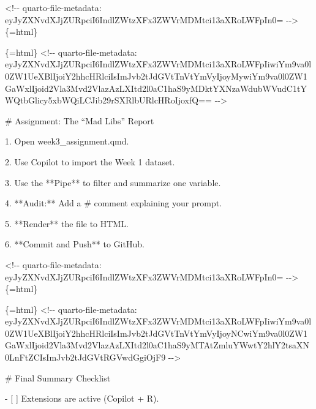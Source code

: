 \documentclass[
  letterpaper,
  DIV=11,
  numbers=noendperiod,
  oneside]{scrreprt}
\newenvironment{Shaded}{\begin{snugshade}}{\end{snugshade}}
\newcommand{\FunctionTok}[1]{\textcolor[rgb]{0.28,0.35,0.67}{#1}}
\newcommand{\InformationTok}[1]{\textcolor[rgb]{0.37,0.37,0.37}{#1}}
\newcommand{\NormalTok}[1]{\textcolor[rgb]{0.00,0.23,0.31}{#1}}
\newcommand{\SpecialStringTok}[1]{\textcolor[rgb]{0.13,0.47,0.30}{#1}}
\newcommand{\VariableTok}[1]{\textcolor[rgb]{0.07,0.07,0.07}{#1}}
\begin{document}
\begin{Shaded}
\begin{Highlighting}[numbers=left,,]
\InformationTok{\textasciigrave{}\textless{}!{-}{-} quarto{-}file{-}metadata: eyJyZXNvdXJjZURpciI6IndlZWtzXFx3ZWVrMDMtci13aXRoLWFpIn0= {-}{-}\textgreater{}\textasciigrave{}}\NormalTok{\{=html\}}

\InformationTok{\textasciigrave{}\textasciigrave{}\textasciigrave{}\{=html\}}
\InformationTok{\textless{}!{-}{-} quarto{-}file{-}metadata: eyJyZXNvdXJjZURpciI6IndlZWtzXFx3ZWVrMDMtci13aXRoLWFpIiwiYm9va0l0ZW1UeXBlIjoiY2hhcHRlciIsImJvb2tJdGVtTnVtYmVyIjoyMywiYm9va0l0ZW1GaWxlIjoid2Vla3Mvd2VlazAzLXItd2l0aC1haS9yMDktYXNzaWdubWVudC1tYWQtbGlicy5xbWQiLCJib29rSXRlbURlcHRoIjoxfQ== {-}{-}\textgreater{}}
\InformationTok{\textasciigrave{}\textasciigrave{}\textasciigrave{}}

\FunctionTok{\# Assignment: The “Mad Libs” Report }


\SpecialStringTok{1.  }\NormalTok{Open }\InformationTok{\textasciigrave{}week3\_assignment.qmd\textasciigrave{}}\NormalTok{.}

\SpecialStringTok{2.  }\NormalTok{Use Copilot to import the Week 1 dataset.}

\SpecialStringTok{3.  }\NormalTok{Use the **Pipe** to filter and summarize one variable.}

\SpecialStringTok{4.  }\NormalTok{**Audit:** Add a }\InformationTok{\textasciigrave{}\#\textasciigrave{}}\NormalTok{ comment explaining your prompt.}

\SpecialStringTok{5.  }\NormalTok{**Render** the file to HTML.}

\SpecialStringTok{6.  }\NormalTok{**Commit and Push** to GitHub.}


\InformationTok{\textasciigrave{}\textless{}!{-}{-} quarto{-}file{-}metadata: eyJyZXNvdXJjZURpciI6IndlZWtzXFx3ZWVrMDMtci13aXRoLWFpIn0= {-}{-}\textgreater{}\textasciigrave{}}\NormalTok{\{=html\}}

\InformationTok{\textasciigrave{}\textasciigrave{}\textasciigrave{}\{=html\}}
\InformationTok{\textless{}!{-}{-} quarto{-}file{-}metadata: eyJyZXNvdXJjZURpciI6IndlZWtzXFx3ZWVrMDMtci13aXRoLWFpIiwiYm9va0l0ZW1UeXBlIjoiY2hhcHRlciIsImJvb2tJdGVtTnVtYmVyIjoyNCwiYm9va0l0ZW1GaWxlIjoid2Vla3Mvd2VlazAzLXItd2l0aC1haS9yMTAtZmluYWwtY2hlY2tsaXN0LnFtZCIsImJvb2tJdGVtRGVwdGgiOjF9 {-}{-}\textgreater{}}
\InformationTok{\textasciigrave{}\textasciigrave{}\textasciigrave{}}

\FunctionTok{\# Final Summary Checklist }


\SpecialStringTok{{-}   }\VariableTok{[ ]}\NormalTok{ Extensions are active (Copilot + R).}


\end{Highlighting}
\end{Shaded}
\end{document}
